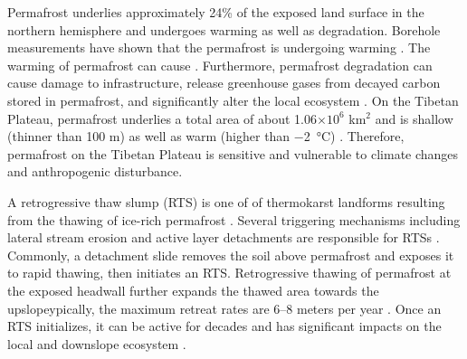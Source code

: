 \documentclass[authoryear,preprint,review,12pt]{elsarticle}
\begin{document}
Permafrost underlies approximately 24\% of the exposed land surface in the northern hemisphere \citep{zhang_statistics_1999} and undergoes warming as well as degradation. Borehole measurements have shown that the permafrost is undergoing  warming  \citep{marchenko_permafrost_2007,osterkamp2005recent,romanovsky_thermal_2010,romanovsky_permafrost_2010,wu2008Recent,zhao_thermal_2010,biskaborn2019permafrost}. The warming of permafrost can cause   \citep{zhao_thermal_2010,aakerman2008thawing,czudek_thermokarst_1970,jorgenson_response_2005,osterkamp_characteristics_2007}. Furthermore, permafrost degradation can cause damage to infrastructure, release greenhouse gases from decayed carbon stored in permafrost, and significantly alter the local ecosystem \citep{tong_effect_1996,grosse_vulnerability_2011,olefeldt_circumpolar_2016,schuur_climate_2015,schuster2018permafrost}. On the Tibetan Plateau, permafrost underlies a total area of about 1.06$\times10^6$ km$^2$ and is shallow (thinner than 100 m) as well as warm (higher than \SI{-2}{\celsius}) \citep{zhou_geocryology_2000}. Therefore, permafrost on the Tibetan Plateau is sensitive and vulnerable to climate changes and anthropogenic disturbance. %

A retrogressive thaw slump (RTS) is one of  of thermokarst landforms resulting from the thawing of ice-rich permafrost . Several triggering mechanisms including lateral stream erosion and active layer detachments are responsible for RTSs \citep{french2017periglacial}. Commonly, a detachment slide removes the soil above permafrost and exposes it to rapid thawing, then initiates an RTS. Retrogressive thawing of permafrost at the exposed headwall further expands the thawed area towards the upslopeypically, the maximum retreat rates are 6--8 meters per year \citep{jorgenson_thermokarst_2013}. Once an RTS initializes, it can be active for decades \citep{burn1989geomorphology, lacelle2010climatic, swanson2018growth,lewkowicz2019extremes} and has significant impacts on the local and downslope ecosystem . 
\end{document}

